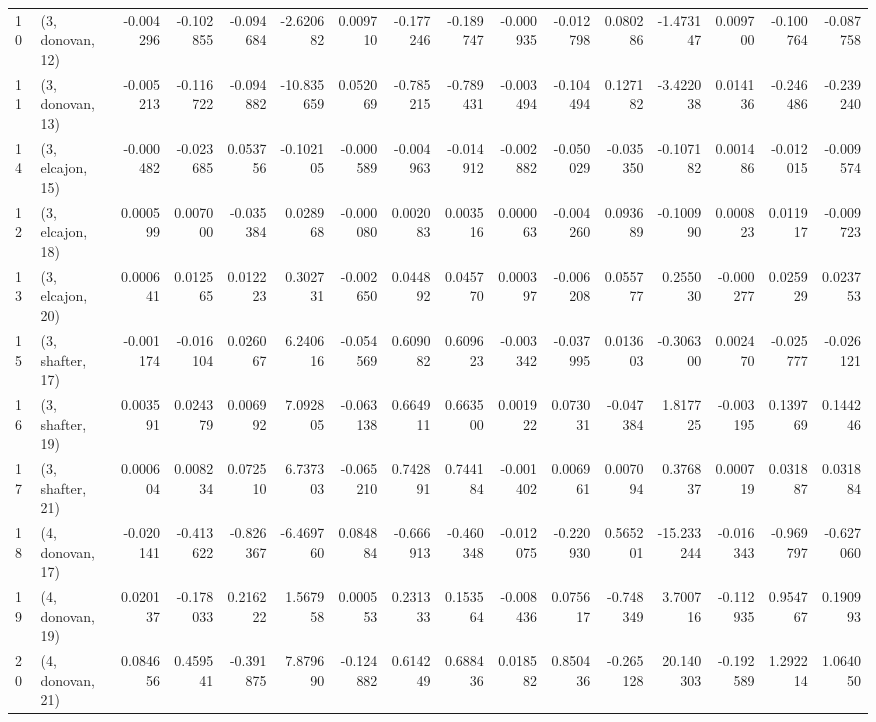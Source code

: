 \begin{tabular}{llrrrrrrrrrrrrrr}
10 &  (3, donovan, 12) &  -0.004296 & -0.102855 & -0.094684 &  -2.620682 &  0.009710 &  -0.177246 & -0.189747 & -0.000935 & -0.012798 &  0.080286 &  -1.473147 &  0.009700 & -0.100764 & -0.087758 \\
11 &  (3, donovan, 13) &  -0.005213 & -0.116722 & -0.094882 & -10.835659 &  0.052069 &  -0.785215 & -0.789431 & -0.003494 & -0.104494 &  0.127182 &  -3.422038 &  0.014136 & -0.246486 & -0.239240 \\
14 &  (3, elcajon, 15) &  -0.000482 & -0.023685 &  0.053756 &  -0.102105 & -0.000589 &  -0.004963 & -0.014912 & -0.002882 & -0.050029 & -0.035350 &  -0.107182 &  0.001486 & -0.012015 & -0.009574 \\
12 &  (3, elcajon, 18) &   0.000599 &  0.007000 & -0.035384 &   0.028968 & -0.000080 &   0.002083 &  0.003516 &  0.000063 & -0.004260 &  0.093689 &  -0.100990 &  0.000823 &  0.011917 & -0.009723 \\
13 &  (3, elcajon, 20) &   0.000641 &  0.012565 &  0.012223 &   0.302731 & -0.002650 &   0.044892 &  0.045770 &  0.000397 & -0.006208 &  0.055777 &   0.255030 & -0.000277 &  0.025929 &  0.023753 \\
15 &  (3, shafter, 17) &  -0.001174 & -0.016104 &  0.026067 &   6.240616 & -0.054569 &   0.609082 &  0.609623 & -0.003342 & -0.037995 &  0.013603 &  -0.306300 &  0.002470 & -0.025777 & -0.026121 \\
16 &  (3, shafter, 19) &   0.003591 &  0.024379 &  0.006992 &   7.092805 & -0.063138 &   0.664911 &  0.663500 &  0.001922 &  0.073031 & -0.047384 &   1.817725 & -0.003195 &  0.139769 &  0.144246 \\
17 &  (3, shafter, 21) &   0.000604 &  0.008234 &  0.072510 &   6.737303 & -0.065210 &   0.742891 &  0.744184 & -0.001402 &  0.006961 &  0.007094 &   0.376837 &  0.000719 &  0.031887 &  0.031884 \\
18 &  (4, donovan, 17) &  -0.020141 & -0.413622 & -0.826367 &  -6.469760 &  0.084884 &  -0.666913 & -0.460348 & -0.012075 & -0.220930 &  0.565201 & -15.233244 & -0.016343 & -0.969797 & -0.627060 \\
19 &  (4, donovan, 19) &   0.020137 & -0.178033 &  0.216222 &   1.567958 &  0.000553 &   0.231333 &  0.153564 & -0.008436 &  0.075617 & -0.748349 &   3.700716 & -0.112935 &  0.954767 &  0.190993 \\
20 &  (4, donovan, 21) &   0.084656 &  0.459541 & -0.391875 &   7.879690 & -0.124882 &   0.614249 &  0.688436 &  0.018582 &  0.850436 & -0.265128 &  20.140303 & -0.192589 &  1.292214 &  1.064050 \\

\end{tabular}
